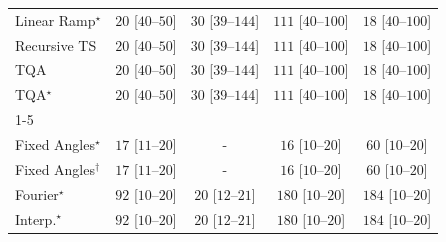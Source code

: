 \begin{tabular}{l|cccc|}
Linear Ramp$^\star$ & {\cellcolor[HTML]{E8F6E4}} \color[HTML]{000000} $20$ [$40$--$50$] & {\cellcolor[HTML]{DDF2D8}} \color[HTML]{000000} $30$ [$39$--$144$] & {\cellcolor[HTML]{4BB062}} \color[HTML]{F1F1F1} $111$ [$40$--$100$] & {\cellcolor[HTML]{EAF7E6}} \color[HTML]{000000} $18$ [$40$--$100$] \\
Recursive TS & {\cellcolor[HTML]{E8F6E4}} \color[HTML]{000000} $20$ [$40$--$50$] & {\cellcolor[HTML]{DDF2D8}} \color[HTML]{000000} $30$ [$39$--$144$] & {\cellcolor[HTML]{4BB062}} \color[HTML]{F1F1F1} $111$ [$40$--$100$] & {\cellcolor[HTML]{EAF7E6}} \color[HTML]{000000} $18$ [$40$--$100$] \\
TQA & {\cellcolor[HTML]{E8F6E4}} \color[HTML]{000000} $20$ [$40$--$50$] & {\cellcolor[HTML]{DDF2D8}} \color[HTML]{000000} $30$ [$39$--$144$] & {\cellcolor[HTML]{4BB062}} \color[HTML]{F1F1F1} $111$ [$40$--$100$] & {\cellcolor[HTML]{EAF7E6}} \color[HTML]{000000} $18$ [$40$--$100$] \\
TQA$^\star$ & {\cellcolor[HTML]{E8F6E4}} \color[HTML]{000000} $20$ [$40$--$50$] & {\cellcolor[HTML]{DDF2D8}} \color[HTML]{000000} $30$ [$39$--$144$] & {\cellcolor[HTML]{4BB062}} \color[HTML]{F1F1F1} $111$ [$40$--$100$] & {\cellcolor[HTML]{EAF7E6}} \color[HTML]{000000} $18$ [$40$--$100$] \\
\cline{1-5}
\multicolumn{5}{c}{\rule{0pt}{8pt}SV} \\
\midrule
Fixed Angles$^\star$ & {\cellcolor[HTML]{EBF7E7}} \color[HTML]{000000} $17$ [$11$--$20$] & {\cellcolor[HTML]{000000}} \color[HTML]{F1F1F1} {\cellcolor{white}} \color{black} - & {\cellcolor[HTML]{ECF8E8}} \color[HTML]{000000} $16$ [$10$--$20$] & {\cellcolor[HTML]{B1E0AB}} \color[HTML]{000000} $60$ [$10$--$20$] \\
Fixed Angles$^\dagger$ & {\cellcolor[HTML]{EBF7E7}} \color[HTML]{000000} $17$ [$11$--$20$] & {\cellcolor[HTML]{000000}} \color[HTML]{F1F1F1} {\cellcolor{white}} \color{black} - & {\cellcolor[HTML]{ECF8E8}} \color[HTML]{000000} $16$ [$10$--$20$] & {\cellcolor[HTML]{B1E0AB}} \color[HTML]{000000} $60$ [$10$--$20$] \\
Fourier$^\star$ & {\cellcolor[HTML]{75C477}} \color[HTML]{000000} $92$ [$10$--$20$] & {\cellcolor[HTML]{E8F6E4}} \color[HTML]{000000} $20$ [$12$--$21$] & {\cellcolor[HTML]{004A1E}} \color[HTML]{F1F1F1} $180$ [$10$--$20$] & {\cellcolor[HTML]{00441B}} \color[HTML]{F1F1F1} $184$ [$10$--$20$] \\
Interp.$^\star$ & {\cellcolor[HTML]{75C477}} \color[HTML]{000000} $92$ [$10$--$20$] & {\cellcolor[HTML]{E8F6E4}} \color[HTML]{000000} $20$ [$12$--$21$] & {\cellcolor[HTML]{004A1E}} \color[HTML]{F1F1F1} $180$ [$10$--$20$] & {\cellcolor[HTML]{00441B}} \color[HTML]{F1F1F1} $184$ [$10$--$20$] \\

\end{tabular}
